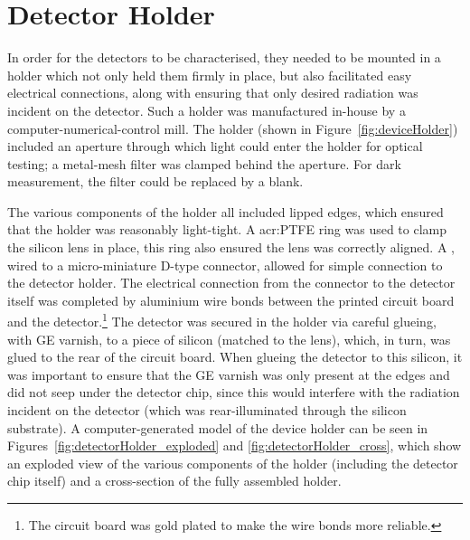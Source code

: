 %
\section{Detector Holder}\label{sec:detectorHolder}
In order for the detectors to be characterised, they needed to be mounted in a holder which not only held them firmly in place, but also facilitated easy electrical connections, along with ensuring that only desired radiation was incident on the detector. Such a holder was manufactured in-house by a computer-numerical-control mill. The holder (shown in Figure~\ref{fig:deviceHolder}) included an aperture through which light could enter the holder for optical testing; a metal-mesh filter was clamped behind the aperture. For dark measurement, the filter could be replaced by a blank.
\par 
The various components of the holder all included lipped edges, which ensured that the holder was reasonably light-tight. A \gls{acr:PTFE} ring was used to clamp the silicon lens in place, this ring also ensured the lens was correctly aligned. A , wired to a micro-miniature D-type connector, allowed for simple connection to the detector holder. The electrical connection from the connector to the detector itself was completed by aluminium wire bonds between the printed circuit board and the detector.\footnote{The circuit board was gold plated to make the wire bonds more reliable.} The detector was secured in the holder via careful glueing, with GE varnish, to a piece of silicon (matched to the lens), which, in turn, was glued to the rear of the circuit board. When glueing the detector to this silicon, it was important to ensure that the GE varnish was only present at the edges and did not seep under the detector chip, since this would interfere with the radiation incident on the detector (which was rear-illuminated through the silicon substrate). A computer-generated model of the device holder can be seen in Figures~\ref{fig:detectorHolder_exploded} and \ref{fig:detectorHolder_cross}, which show an exploded view of the various components of the holder (including the detector chip itself) and a cross-section of the fully assembled holder.
